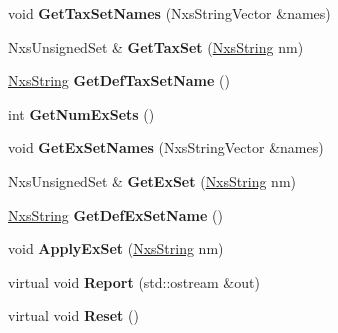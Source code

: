 \begin{DoxyCompactItemize}
\item 
\hypertarget{classNxsAssumptionsBlock_a26f2fa28d0797b832dfaebe29e5a5e2e}{
void {\bfseries GetTaxSetNames} (NxsStringVector \&names)}
\label{classNxsAssumptionsBlock_a26f2fa28d0797b832dfaebe29e5a5e2e}

\item 
\hypertarget{classNxsAssumptionsBlock_a77edaa6ed625e35f6cab8c8f2ff85f08}{
NxsUnsignedSet \& {\bfseries GetTaxSet} (\hyperlink{classNxsString}{NxsString} nm)}
\label{classNxsAssumptionsBlock_a77edaa6ed625e35f6cab8c8f2ff85f08}

\item 
\hypertarget{classNxsAssumptionsBlock_a6a5f666ad93a34e92731810ab566b1d7}{
\hyperlink{classNxsString}{NxsString} {\bfseries GetDefTaxSetName} ()}
\label{classNxsAssumptionsBlock_a6a5f666ad93a34e92731810ab566b1d7}

\item 
\hypertarget{classNxsAssumptionsBlock_ab0cb9b501b0e4698df204c243352caeb}{
int {\bfseries GetNumExSets} ()}
\label{classNxsAssumptionsBlock_ab0cb9b501b0e4698df204c243352caeb}

\item 
\hypertarget{classNxsAssumptionsBlock_a858efae26b2eff355b5240405493f057}{
void {\bfseries GetExSetNames} (NxsStringVector \&names)}
\label{classNxsAssumptionsBlock_a858efae26b2eff355b5240405493f057}

\item 
\hypertarget{classNxsAssumptionsBlock_ab3e975170b5b3f292cb4d9de01297f43}{
NxsUnsignedSet \& {\bfseries GetExSet} (\hyperlink{classNxsString}{NxsString} nm)}
\label{classNxsAssumptionsBlock_ab3e975170b5b3f292cb4d9de01297f43}

\item 
\hypertarget{classNxsAssumptionsBlock_a008b67365008523a422529f45d1d070e}{
\hyperlink{classNxsString}{NxsString} {\bfseries GetDefExSetName} ()}
\label{classNxsAssumptionsBlock_a008b67365008523a422529f45d1d070e}

\item 
\hypertarget{classNxsAssumptionsBlock_a9d4a7bf784a6a97d1df06a88c0082459}{
void {\bfseries ApplyExSet} (\hyperlink{classNxsString}{NxsString} nm)}
\label{classNxsAssumptionsBlock_a9d4a7bf784a6a97d1df06a88c0082459}

\item 
\hypertarget{classNxsAssumptionsBlock_afda8d8dff218d4eb7ca3179d53af2e5b}{
virtual void {\bfseries Report} (std::ostream \&out)}
\label{classNxsAssumptionsBlock_afda8d8dff218d4eb7ca3179d53af2e5b}

\item 
\hypertarget{classNxsAssumptionsBlock_a04c34387927c777895d86b06b3c8569e}{
virtual void {\bfseries Reset} ()}
\label{classNxsAssumptionsBlock_a04c34387927c777895d86b06b3c8569e}

\end{DoxyCompactItemize}
